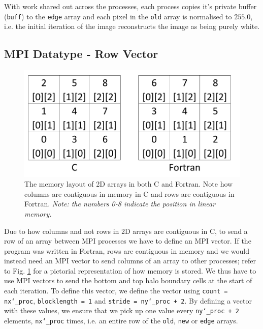 \documentclass[11pt, a4paper]{article}
\begin{document}
			With work shared out across the processes, each process copies it's private buffer (\texttt{buff}) to the \texttt{edge} array and each pixel in the \texttt{old} array is normalised to $255.0$, i.e. the initial iteration of the image reconstructs the image as being purely white.
	
		\subsection{MPI Datatype - Row Vector} \label{sect:row_vector}
				\begin{figure}
					\centering
					\includegraphics[scale=0.4]{memory_layout.png}
					\caption{The memory layout of 2D arrays in both C and Fortran. Note how columns are contiguous in memory in C and rows are contiguous in Fortran. \textit{Note: the numbers 0-8 indicate the position in linear memory.}}
					\label{fig:memory_layout}
				\end{figure}
				
			Due to how columns and not rows in 2D arrays are contiguous in C, to send a row of an array between MPI processes we have to define an MPI vector. If the program was written in Fortran, rows are contiguous in memory and we would instead need an MPI vector to send columns of an array to other processes; refer to Fig. \ref{fig:memory_layout} for a pictorial representation of how memory is stored. We thus have to use MPI vectors to send the bottom and top halo boundary cells at the start of each iteration. To define this vector, we define the vector using \texttt{count = nx\char`_proc}, \texttt{blocklength = 1} and \texttt{stride = ny\char`_proc + 2}. By defining a vector with these values, we ensure that we pick up one value every \texttt{ny\char`_proc + 2} elements, \texttt{nx\char`_proc} times, i.e. an entire row of the \texttt{old}, \texttt{new} or \texttt{edge} arrays.
				
\end{document}
